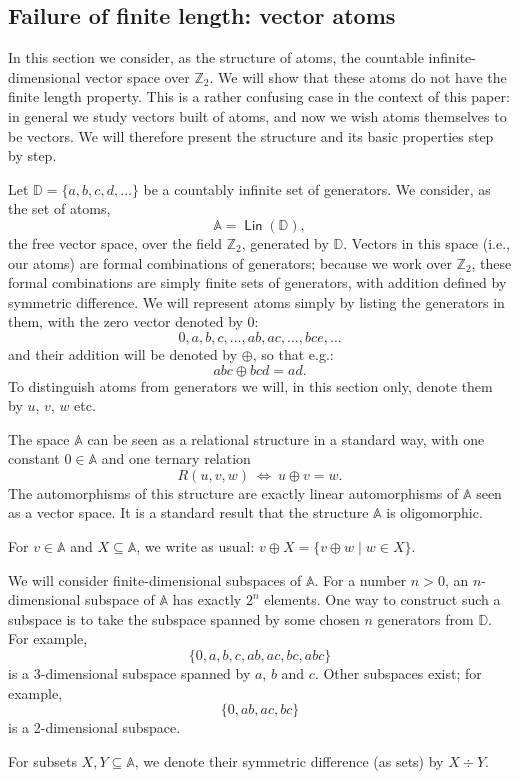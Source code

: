 \documentclass[10pt,a4paper]{amsart}
\numberwithin{equation}{section}
\renewcommand{\iff}{\Leftrightarrow}
\newcommand{\Z}{{\mathbb Z}}
\newcommand{\D}{{\mathbb D}}
\newcommand{\xor}{\div}
\newcommand{\atoms}{\mathbb A}
\DeclareMathOperator{\lin}{\mathsf{Lin}}
\begin{document}
\subsection{Failure of finite length: vector atoms}\label{sec:vectoratoms}

In this section we consider, as the structure of atoms, the countable infinite-dimensional vector space over $\Z_2$. We will show that these atoms do not have the finite length property. This is a rather confusing case in the context of this paper: in general we study vectors built of atoms, and now we wish atoms themselves to be vectors. We will therefore present the structure and its basic properties step by step.

Let $\D = \{a,b,c,d,\ldots\}$ be a countably infinite set of generators. We consider, as the set of atoms, 
\[
	\atoms = \lin(\D),
\]
the free vector space, over the field $\Z_2$, generated by $\D$. Vectors in this space (i.e., our atoms) are formal combinations of generators; because we work over $\Z_2$, these formal combinations are simply finite sets of generators, with addition defined by symmetric difference. We will represent atoms simply by listing the generators in them, with the zero vector denoted by $0$:
\[
	0, a, b, c, \ldots, ab, ac, \ldots, bce, \ldots
\]
and their addition will be denoted by $\oplus$, so that e.g.:
\[
	abc \oplus bcd = ad.
\]
To distinguish atoms from generators we will, in this section only, denote them by $u$, $v$, $w$ etc. 

The space $\atoms$ can be seen as a relational structure in a standard way, with one constant $0\in\atoms$ and one ternary relation
\[
	R(u,v,w)\ \iff\ u\oplus v=w.
\]
The automorphisms of this structure are exactly linear automorphisms of $\atoms$ seen as a vector space. It is a standard result that the structure $\atoms$ is oligomorphic.

For $v\in \atoms$ and $X\subseteq \atoms$, we write as usual: $v\oplus X = \{v\oplus w \mid w\in X\}$.

We will consider finite-dimensional subspaces of $\atoms$. For a number $n>0$, an $n$-dimensional subspace of $\atoms$ has exactly $2^n$ elements. One way to construct such a subspace is to take the subspace spanned by some chosen $n$ generators from $\D$. For example,
\[
\{0,a,b,c,ab,ac,bc,abc\}
\]
is a 3-dimensional subspace spanned by $a$, $b$ and $c$. Other subspaces exist; for example,
\[
\{0,ab,ac,bc\}
\]
is a 2-dimensional subspace.

For subsets $X,Y\subseteq\atoms$, we denote their symmetric difference (as sets) by $X\xor Y$. 
\end{document}
